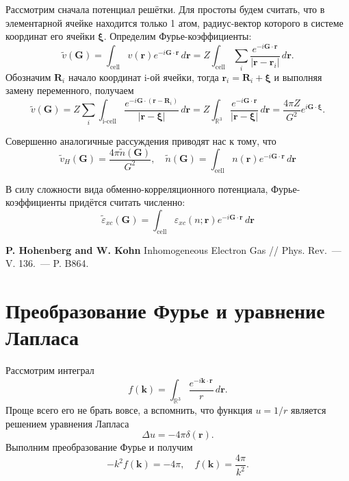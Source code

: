 \documentclass[11pt,russian]{ncc}
\newcommand{\eps}{\varepsilon}
\renewcommand{\vec}{\boldsymbol}
\begin{document}
    Рассмотрим сначала потенциал решётки. Для простоты будем считать, что в элементарной ячейке находится только 1 атом, радиус-вектор которого в системе координат его ячейки \( \vec{\xi} \). Определим Фурье-коэффициенты:
    \begin{equation}
        \tilde{v}(\vec{G}) = \int_\text{cell} v(\vec{r}) e^{-i\vec{G}\cdot\vec{r}}\,d\vec{r} = Z \int_\text{cell} \sum_{i} \frac{e^{-i\vec{G}\cdot\vec{r}}}{|\vec{r} - \vec{r}_i|}\,d\vec{r}.
    \end{equation}
    Обозначим \(\vec{R}_i\) начало координат i-ой ячейки, тогда \( \vec{r}_i = \vec{R}_i + \vec{\xi} \) и выполняя замену переменного, получаем
    \begin{equation}
        \tilde{v}(\vec{G}) = Z \sum_{i} \int_\text{i-cell} \frac{e^{-i\vec{G}\cdot(\vec{r} - \vec{R}_i)}}{|\vec{r} - \vec{\xi}|}\,d\vec{r} =
        Z \int_{\mathbb{R}^3}\frac{e^{-i\vec{G}\cdot\vec{r}}}{|\vec{r} - \vec{\xi}|}\,d\vec{r} = \frac{4\pi Z}{G^2}e^{i\vec{G}\cdot\vec{\xi}}.
    \end{equation}

    Совершенно аналогичные рассуждения приводят нас к тому, что
    \begin{equation}
        \tilde{v}_H(\vec{G}) = \frac{4\pi\tilde{n}(\vec{G})}{G^2},\quad
        \tilde{n}(\vec{G}) = \int_\text{cell} n(\vec{r}) e^{-i\vec{G}\cdot\vec{r}}\,d\vec{r}
    \end{equation}

    В силу сложности вида обменно-корреляционного потенциала, Фурье-коэффициенты придётся считать численно:
    \begin{equation}
        \tilde{\eps}_{xc}(\vec{G}) = \int_\text{cell} \eps_{xc}(n;\vec{r})e^{-i\vec{G}\cdot\vec{r}}\,d\vec{r}
    \end{equation}

    \begin{thebibliography}{99}
         \textbf{P. Hohenberg and W. Kohn} Inhomogeneous Electron Gas // Phys. Rev.~--- V. 136.~--- P. B864.
    \end{thebibliography}

    \appendix
    \section{Преобразование Фурье и уравнение Лапласа}
    Рассмотрим интеграл
    \begin{equation}
        f(\vec{k}) = \int_{\mathbb{R}^3} \frac{e^{-i\vec{k}\cdot\vec{r}}}{r}\,d\vec{r}.
    \end{equation}
    Проще всего его не брать вовсе, а вспомнить, что функция \( u = 1/r \) является решением уравнения Лапласа
    \begin{equation}
        \Delta u = -4\pi\delta(\vec{r}).
    \end{equation}
    Выполним преобразование Фурье и получим
    \begin{equation}
        -k^2 f(\vec{k}) = -4\pi,\quad f(\vec{k}) = \frac{4\pi}{k^2}.
    \end{equation}
\end{document}
